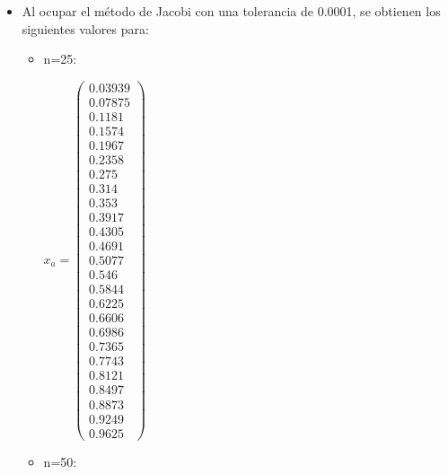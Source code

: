 \documentclass{udpreport}
\begin{document}
\begin{enumerate}
\begin{enumerate}
\begin{itemize}
				\item Al ocupar el método de Jacobi con una tolerancia de 0.0001, se obtienen los siguientes valores para:
				\begin{itemize}
					\item n=25: 
					
					$x_{a} = \left(\begin{array}{c} 0.03939\\ 0.07875\\ 0.1181\\ 0.1574\\ 0.1967\\ 0.2358\\ 0.275\\ 0.314\\ 0.353\\ 0.3917\\ 0.4305\\ 0.4691\\ 0.5077\\ 0.546\\ 0.5844\\ 0.6225\\ 0.6606\\ 0.6986\\ 0.7365\\ 0.7743\\ 0.8121\\ 0.8497\\ 0.8873\\ 0.9249\\ 0.9625 \end{array}\right) $
					
					
					\item n=50:
					

\end{itemize}
\end{itemize}
\end{enumerate}
\end{enumerate}
\end{document}
